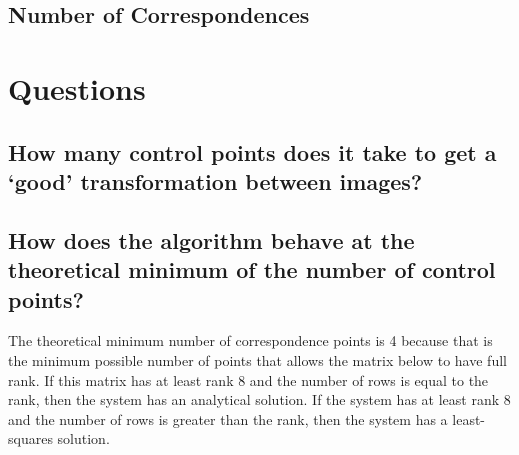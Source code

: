 \documentclass[]{article}
\begin{document}
	\subsection{Number of Correspondences}
	\newpage
	
\section{Questions}
	\subsection{How many control points does it take to get a `good' transformation between images?}
	\subsection{How does the algorithm behave at the theoretical minimum of the number of control points?}
		The theoretical minimum number of correspondence points is 4 because that is the minimum possible number of points that allows the matrix below to have full rank. If this matrix has at least rank 8 and the number of rows is equal to the rank, then the system has an analytical solution. If the system has at least rank 8 and the number of rows is greater than the rank, then the system has a least-squares solution.
\end{document}
